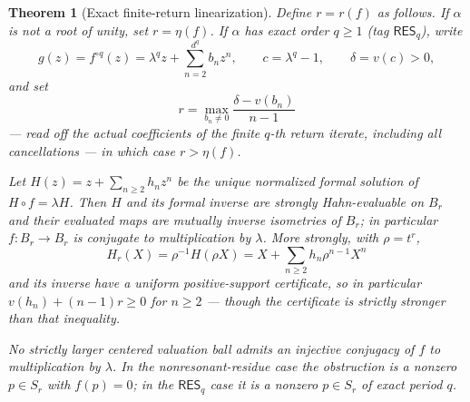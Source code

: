 \documentclass[11pt,letterpaper]{article}
\newtheorem{theorem}{Theorem}[section]
\theoremstyle{definition}
\theoremstyle{remark}
\newcommand{\resq}{\mathsf{RES}_q}
\numberwithin{equation}{section}
\begin{document}
\begin{theorem}[Exact finite-return linearization]\label{dyn:thm:exact}
Define $r=r(f)$ as follows. If $\alpha$ is \emph{not} a root of unity, set
$r=\eta(f)$. If $\alpha$ has exact order $q\ge1$ (tag $\resq$), write
\begin{equation}\label{dyn:eq:g-main}
 g(z)=f^{\circ q}(z)=\lambda^{q}z+\sum_{n=2}^{d^{q}}b_nz^{n},
 \qquad c=\lambda^{q}-1,\qquad \delta=v(c)>0,
\end{equation}
and set
\begin{equation}\label{dyn:eq:exact-r}
 \boxed{\;r=\max_{b_n\ne0}\frac{\delta-v(b_n)}{n-1}\;}
\end{equation}
--- read off the \emph{actual coefficients of the finite $q$-th return
iterate}, including all cancellations --- in which case $r>\eta(f)$.

Let $H(z)=z+\sum_{n\ge2}h_nz^{n}$ be the unique normalized formal solution
of $H\circ f=\lambda H$. Then $H$ and its formal inverse are strongly
Hahn-evaluable on $B_r$ and their evaluated maps are mutually inverse
isometries of $B_r$; in particular $f:B_r\to B_r$ is conjugate to
multiplication by $\lambda$. More strongly, with $\rho=t^{r}$,
\begin{equation}\label{dyn:eq:H-scaled}
 H_r(X)=\rho^{-1}H(\rho X)=X+\sum_{n\ge2}h_n\rho^{n-1}X^{n}
\end{equation}
and its inverse have a uniform positive-support certificate, so in
particular $v(h_n)+(n-1)r\ge0$ for $n\ge2$ --- though the certificate is
strictly stronger than that inequality.

No strictly larger \emph{centered valuation ball} admits an injective
conjugacy of $f$ to multiplication by $\lambda$. In the nonresonant-residue
case the obstruction is a nonzero $p\in S_r$ with $f(p)=0$; in the
$\resq$ case it is a nonzero $p\in S_r$ of exact period $q$.
\end{theorem}
\end{document}
